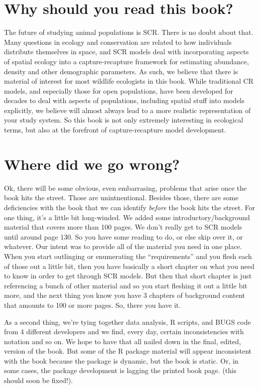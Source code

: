 \section*{Why should you read this book?}

The future of studying animal populations is SCR. There is no doubt
about that. Many questions in ecology and conservation are related to how individuals distribute themselves in space, and SCR models deal with incorporating aspects of spatial ecology into a capture-recapture framework for estimating abundance, density and other demographic parameters. As such, we believe that there is material of interest for most wildlife ecologists in this book. While traditional CR models, and especially those for open populations, have been developed for decades to deal with aspects of populations, including spatial stuff into models explicitly, we believe will almost always lead to a more realistic representation of your study system.  So this book is not only extremely interesting in ecological terms, but also at the forefront of capture-recapture model development.

\section*{Where did we go wrong?}

Ok, there will be some obvious, even embarrasing, problems that arise
once the book hits the street. Those are unintnentional. Besides
those, there are some deficiencies with the book that we can identify
{\it before} the book hits the street. For one thing, it's a little
bit long-winded. We added some introductory/background material that
covers more than 100 pages. We don't really get to SCR models until
around page 130.  So you have some reading to do, or else skip over
it, or whatever. Our intent was to provide all of the material you
need in one place. When you start outlinging or enumerating the
``requirements'' and you flesh each of those out a little bit, then
you have basically a short chapter on what you need to know in order
to get through SCR models. But then that short chapter is just
referencing a bunch of other material and so you start fleshing it out
a little bit more, and the next thing you know you have 3 chapters of
background content that amounts to 100 or more pages.  So, there you
have it.  

As a second thing, we're tying together data analysis, R scripts, and
BUGS code from 4 different developers and we find, every day, certain
inconsistencies with notation and so on. We hope to have that all
nailed down in the final, edited, version of the book. But some of the
R package material will appear inconsistent with the book because the
package is dynamic, but the book is static. Or, in some cases, the
package development is lagging the printed book page. (this should
soon be fixed!). 




